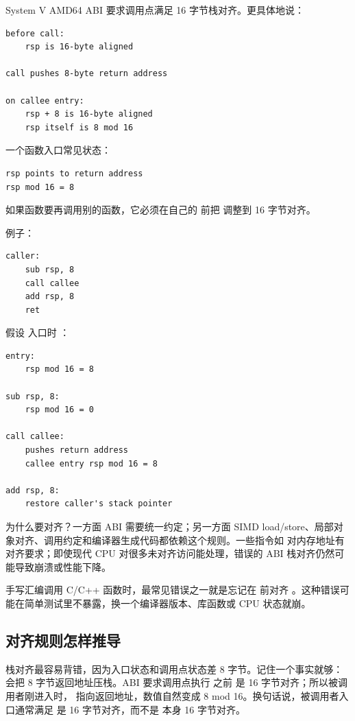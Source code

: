 System V AMD64 ABI 要求调用点满足 16 字节栈对齐。更具体地说：

\begin{lstlisting}
before call:
    rsp is 16-byte aligned

call pushes 8-byte return address

on callee entry:
    rsp + 8 is 16-byte aligned
    rsp itself is 8 mod 16
\end{lstlisting}

一个函数入口常见状态：

\begin{lstlisting}
rsp points to return address
rsp mod 16 = 8
\end{lstlisting}

如果函数要再调用别的函数，它必须在自己的  前把  调整到 16 字节对齐。

例子：

\begin{lstlisting}
caller:
    sub rsp, 8
    call callee
    add rsp, 8
    ret
\end{lstlisting}

假设  入口时 ：

\begin{lstlisting}
entry:
    rsp mod 16 = 8

sub rsp, 8:
    rsp mod 16 = 0

call callee:
    pushes return address
    callee entry rsp mod 16 = 8

add rsp, 8:
    restore caller's stack pointer
\end{lstlisting}

为什么要对齐？一方面 ABI 需要统一约定；另一方面 SIMD load/store、局部对象对齐、调用约定和编译器生成代码都依赖这个规则。一些指令如  对内存地址有对齐要求；即使现代 CPU 对很多未对齐访问能处理，错误的 ABI 栈对齐仍然可能导致崩溃或性能下降。

\begin{warningbox}
手写汇编调用 C/C++ 函数时，最常见错误之一就是忘记在  前对齐 。这种错误可能在简单测试里不暴露，换一个编译器版本、库函数或 CPU 状态就崩。
\end{warningbox}

\subsection{对齐规则怎样推导}

栈对齐最容易背错，因为入口状态和调用点状态差 8 字节。记住一个事实就够： 会把 8 字节返回地址压栈。ABI 要求调用点执行  之前  是 16 字节对齐；所以被调用者刚进入时， 指向返回地址，数值自然变成 8 mod 16。换句话说，被调用者入口通常满足  是 16 字节对齐，而不是  本身 16 字节对齐。

